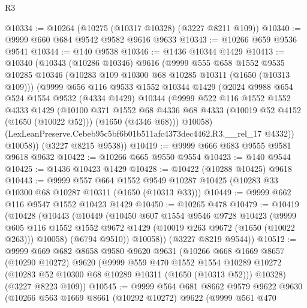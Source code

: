 \begin{lexlean}{R3}
\begin{coremodule}
@10334 := @10264 (@10275 (@10317 @10328) (@3227 @8211 @109))
@10340 := @9999 @660 @684 @9542 @9582 @9616 @9633
@10343 := @10266 @659 @9536 @9541
@10344 := @140 @9538
@10346 := @1436 @10344 @1429
@10413 := @10340
    (@10343
      (@10286 @10346)
      @9616
      (@9999
        @555
        @658
        @1552
        @9535
        @10285
        @10346
        (@10283 @109 @10300 @68 @10285 @10311 (@1650 (@10313 @109)))
        (@9999
          @656
          @116
          @9533
          @1552
          @10344
          @1429
          (@2024
            @9988
            @654
            @524
            @1554
            @9532
            (@4334 @1429)
            @10344
            (@9999
              @522
              @116
              @1552
              @1552
              @4333
              @1429
              (@10100
                @371
                @1552
                @68
                @4336
                @68
                @4333
                (@10019 @52 @4152 (@1650 (@10022 @52)))
                (@1650 (@4346 @68)))
              @10058)
            (LexLeanPreserve.Cebeb95c5bf6b01b511afc4373dec4462.R3.__rel_17 @4332))
          @10058))
      (@3227 @8215 @9538))
@10419 := @9999 @666 @683 @9555 @9581 @9618 @9632
@10422 := @10266 @665 @9550 @9554
@10423 := @140 @9544
@10425 := @1436 @10423 @1429
@10428 := @10422 (@10288 @10425) @9618
@10443 := @9999
    @557
    @664
    @1552
    @9549
    @10287
    @10425
    (@10283 @33 @10300 @68 @10287 @10311 (@1650 (@10313 @33)))
@10449 := @9999 @662 @116 @9547 @1552 @10423 @1429
@10450 := @10265 @478
@10479 := @10419
    (@10428
      (@10443
        (@10449
          (@10450
            @607
            @1554
            @9546
            @9728
            @10423
            (@9999
              @605
              @116
              @1552
              @1552
              @9672
              @1429
              (@10019 @263 @9672 (@1650 (@10022 @263)))
              @10058)
            (@6794 @9510))
          @10058))
      (@3227 @8219 @9544))
@10512 := @9999
    @669
    @682
    @8658
    @9580
    @9620
    @9631
    (@10266
      @668
      @1669
      @8657
      (@10290 @10272)
      @9620
      (@9999
        @559
        @470
        @1552
        @1554
        @10289
        @10272
        (@10283 @52 @10300 @68 @10289 @10311 (@1650 (@10313 @52)))
        @10328)
      (@3227 @8223 @109))
@10545 := @9999
    @564
    @681
    @8662
    @9579
    @9622
    @9630
    (@10266
      @563
      @1669
      @8661
      (@10292 @10272)
      @9622
      (@9999
        @561
        @470

\end{coremodule}
\end{lexlean}
